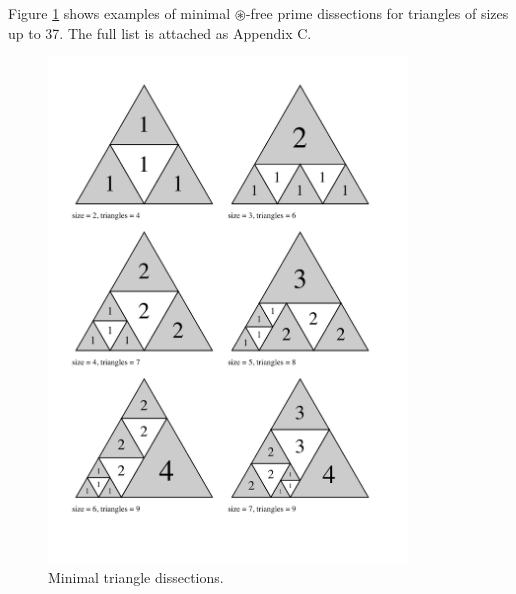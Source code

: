 \setcounter{chapter}{2}

Figure \ref{fig:min-triangle-dissections} shows examples of minimal $\circledast$-free prime dissections for triangles of sizes up to 37. The full list is attached as Appendix C.

\bigskip

\begin{figure}[htb]
\centering
\includegraphics[trim=2em 4em 3em 2em, width=0.85\textwidth]{img/tranquility1.pdf}
\caption{Minimal triangle dissections.}
\label{fig:min-triangle-dissections}
\end{figure}

